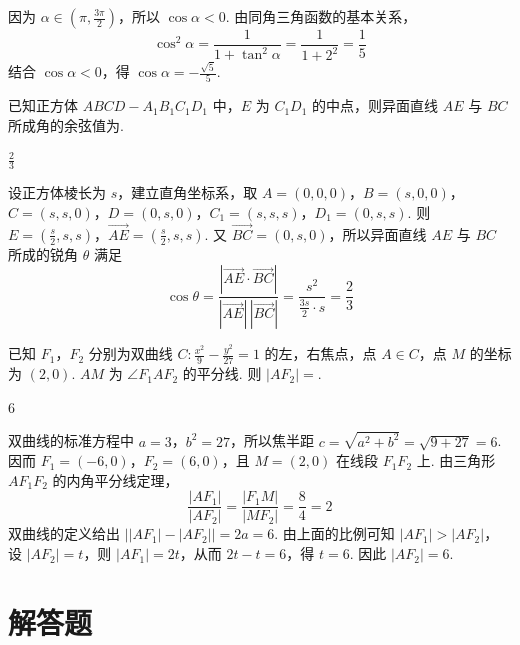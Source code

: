 \begin{solution}
因为 \(\alpha\in\left(\pi,\frac{3\pi}{2}\right)\)，所以 \(\cos\alpha<0\). 由同角三角函数的基本关系，
\[
\cos^2\alpha=\frac{1}{1+\tan^2\alpha}=\frac{1}{1+2^2}=\frac{1}{5}
\]
结合 \(\cos\alpha<0\)，得 \(\cos\alpha=-\frac{\sqrt{5}}{5}\).
\end{solution}

\begin{problem}
已知正方体 \(ABCD-A_1B_1C_1D_1\) 中，\(E\) 为 \(C_1D_1\) 的中点，则异面直线 \(AE\) 与 \(BC\) 所成角的余弦值为\fillinblank{}.
\end{problem}

\begin{answer}
\(\frac{2}{3}\)
\end{answer}

\begin{solution}
设正方体棱长为 \(s\)，建立直角坐标系，取
\(A=(0,0,0)\)，\(B=(s,0,0)\)，\(C=(s,s,0)\)，\(D=(0,s,0)\)，\(C_1=(s,s,s)\)，\(D_1=(0,s,s)\). 则
\(E=\left(\frac{s}{2},s,s\right)\)，\(\overrightarrow{AE}=\left(\frac{s}{2},s,s\right)\).
又 \(\overrightarrow{BC}=(0,s,0)\)，所以异面直线 \(AE\) 与 \(BC\) 所成的锐角 \(\theta\) 满足
\[
\cos\theta=\frac{\left|\overrightarrow{AE}\cdot\overrightarrow{BC}\right|}{|\overrightarrow{AE}|\,|\overrightarrow{BC}|}
=\frac{s^2}{\frac{3s}{2}\cdot s}=\frac{2}{3}
\]
\end{solution}

\begin{problem}
已知 \(F_1\)，\(F_2\) 分别为双曲线 \(C:\frac{x^2}{9}-\frac{y^2}{27}=1\) 的左，右焦点，点 \(A\in C\)，点 \(M\) 的坐标为 \((2,0)\). \(AM\) 为 \(\angle F_1AF_2\) 的平分线. 则 \(|AF_2|=\)\fillinblank{}.
\end{problem}

\begin{answer}
6
\end{answer}

\begin{solution}
双曲线的标准方程中 \(a=3\)，\(b^2=27\)，所以焦半距
\(c=\sqrt{a^2+b^2}=\sqrt{9+27}=6\). 因而 \(F_1=(-6,0)\)，\(F_2=(6,0)\)，且 \(M=(2,0)\) 在线段 \(F_1F_2\) 上. 由三角形 \(AF_1F_2\) 的内角平分线定理，
\[
\frac{|AF_1|}{|AF_2|}=\frac{|F_1M|}{|MF_2|}=\frac{8}{4}=2
\]
双曲线的定义给出 \(\bigl||AF_1|-|AF_2|\bigr|=2a=6\). 由上面的比例可知 \(|AF_1|>|AF_2|\)，设 \(|AF_2|=t\)，则 \(|AF_1|=2t\)，从而 \(2t-t=6\)，得 \(t=6\). 因此 \(|AF_2|=6\).
\end{solution}

\section{解答题}

